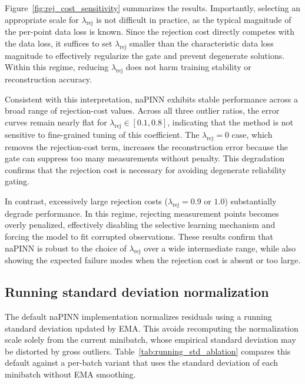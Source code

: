 \documentclass{article}
\theoremstyle{plain}
\theoremstyle{definition}
\theoremstyle{remark}
\begin{document}
Figure~\ref{fig:rej_cost_sensitivity} summarizes the results.
Importantly, selecting an appropriate scale for $\lambda_{\mathrm{rej}}$ is not difficult in practice, as the typical magnitude of the per-point data loss is known.
Since the rejection cost directly competes with the data loss, it suffices to set $\lambda_{\mathrm{rej}}$ smaller than the characteristic data loss magnitude to effectively regularize the gate and prevent degenerate solutions.
Within this regime, reducing $\lambda_{\mathrm{rej}}$ does not harm training stability or reconstruction accuracy.

Consistent with this interpretation, naPINN exhibits stable performance across a broad range of rejection-cost values.
Across all three outlier ratios, the error curves remain nearly flat for $\lambda_{\mathrm{rej}}\in[0.1,0.8]$, indicating that the method is not sensitive to fine-grained tuning of this coefficient.
The $\lambda_{\mathrm{rej}}=0$ case, which removes the rejection-cost term, increases the reconstruction error because the gate can suppress too many measurements without penalty.
This degradation confirms that the rejection cost is necessary for avoiding degenerate reliability gating.

In contrast, excessively large rejection costs ($\lambda_{\mathrm{rej}}=0.9$ or $1.0$) substantially degrade performance.
In this regime, rejecting measurement points becomes overly penalized, effectively disabling the selective learning mechanism and forcing the model to fit corrupted observations.
These results confirm that naPINN is robust to the choice of $\lambda_{\mathrm{rej}}$ over a wide intermediate range, while also showing the expected failure modes when the rejection cost is absent or too large.

\subsection{Running standard deviation normalization}
\label{appendix:running_std_ablation}

The default naPINN implementation normalizes residuals using a running standard deviation updated by EMA.
This avoids recomputing the normalization scale solely from the current minibatch, whose empirical standard deviation may be distorted by gross outliers.
Table~\ref{tab:running_std_ablation} compares this default against a per-batch variant that uses the standard deviation of each minibatch without EMA smoothing.
\end{document}
